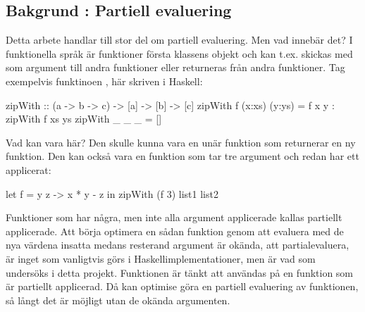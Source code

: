 \documentclass[Rapport]{subfiles}
\begin{document}
\subsection{Bakgrund : Partiell evaluering}
Detta arbete handlar till stor del om partiell evaluering. Men vad innebär det?
I funktionella språk är funktioner första klassens objekt och kan t.ex.
skickas med som argument till andra funktioner eller returneras från
andra funktioner. Tag exempelvis funktinoen , här skriven i Haskell:

\begin{codeEx}
zipWith :: (a -> b -> c) -> [a] -> [b] -> [c]
zipWith f (x:xs) (y:ys) = f x y : zipWith f xs ys
zipWith _ _      _      = []
\end{codeEx}

Vad kan  vara här? Den skulle kunna vara en unär funktion som returnerar en ny
funktion. Den kan också vara en funktion som tar tre argument och redan har ett
applicerat:

\begin{codeEx}
let f = \x y z -> x * y - z
in  zipWith (f 3) list1 list2
\end{codeEx}


Funktioner som har några, men inte alla argument applicerade kallas 
partiellt applicerade. Att börja optimera en sådan funktion genom att evaluera med de nya värdena
insatta medans resterand argument är okända, att partialevaluera,
är inget som vanligtvis görs i Haskellimplementationer, 
men är vad som undersöks i detta projekt. Funktionen  är
tänkt att användas på en funktion som är partiellt applicerad. Då kan optimise göra en
partiell evaluering av funktionen, så långt det är möjligt utan de okända argumenten.

%
%
\end{document}
